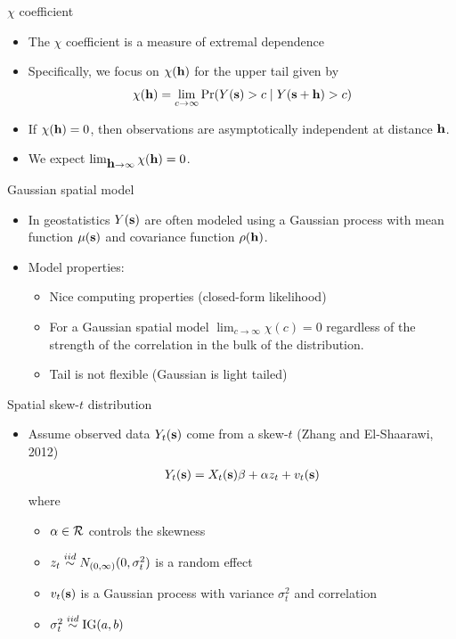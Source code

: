 \documentclass{beamer}
\begin{document}
\begin{frame}{$\chi$ coefficient}
  \begin{itemize} \setlength{\itemsep}{0.5em}
   \item The $\chi$ coefficient is a measure of extremal dependence
   \item Specifically, we focus on $\chi(\mbox{\bf h})$ for the upper tail given by
    \begin{align*}
      \chi(\mbox{\bf h}) = \lim_{c \rightarrow \infty}\Pr(Y(\mbox{\bf s}) > c \mid Y(\mbox{\bf s} + \mbox{\bf h}) > c)
    \end{align*}
    \item If $ \chi(\mbox{\bf h}) = 0$, then observations are asymptotically independent at distance $\mbox{\bf h}$.
    \item We expect $\lim_{\mbox{\bf h} \rightarrow \infty}\chi(\mbox{\bf h})=0$.
  \end{itemize}
\end{frame}

\begin{frame}{Gaussian spatial model}
  \begin{itemize} \setlength{\itemsep}{0.5em}
    \item In geostatistics $Y(\mbox{\bf s})$ are often modeled using a Gaussian process with mean function $\mu(\mbox{\bf s})$ and covariance function
$\rho(\mbox{\bf h})$.
    \item Model properties:
    \begin{itemize}
      \item Nice computing properties (closed-form likelihood)
    \item For a Gaussian spatial model $\lim_{c \rightarrow \infty} \chi(c) = 0$ regardless of the strength of the correlation in the bulk of the distribution.
    \item Tail is not flexible (Gaussian is light tailed)
    \end{itemize}
    \end{itemize}
\end{frame}

\begin{frame}{Spatial skew-$t$ distribution}
  \begin{itemize} \setlength{\itemsep}{0.5em}
    \item Assume observed data $Y_t(\mbox{\bf s})$ come from a skew-$t$ (Zhang and El-Shaarawi, 2012)
    \begin{align*}
      Y_t(\mbox{\bf s}) = X_t(\mbox{\bf s})\beta + \alpha z_t + v_t(\mbox{\bf s})
    \end{align*}
    where
    \begin{itemize} \setlength{\itemsep}{0.25em}
      \item $\alpha \in {\cal R}$ controls the skewness
      \item $z_t \stackrel{iid}{\sim} N_{(0, \infty)}(0, \sigma^2_t)$ is a random effect
      \item $v_t(\mbox{\bf s})$ is a Gaussian process with variance $\sigma^2_t$ and \Matern correlation
      \item $\sigma_t^2 \stackrel{iid}{\sim} \text{IG}(a, b)$
    \end{itemize}
  \end{itemize}
\end{frame}
\end{document}

